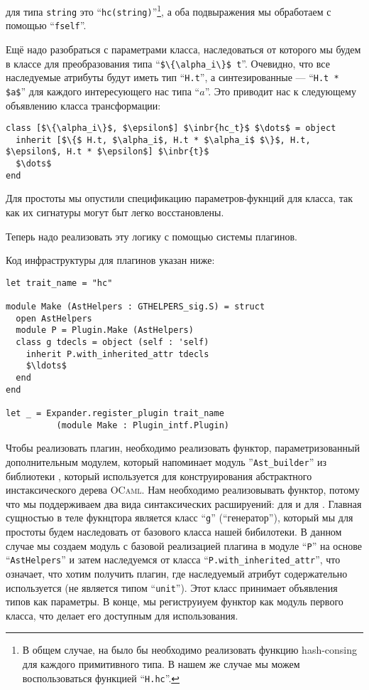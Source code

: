 для типа \lstinline{string} это ``\lstinline{hc(string)}''\footnote{В общем случае, на было бы необходимо реализовать функцию hash-consing для каждого примитивного типа. В нашем же случае мы можем воспользоваться функцией ``\lstinline{H.hc}''.}, а оба подвыражения мы обработаем с помощью ``\lstinline{fself}''.

Ещё надо разобраться с параметрами класса, наследоваться от которого мы будем в классе для преобразования типа ``\lstinline|$\{\alpha_i\}$ t|''. 
Очевидно, что все наследуемые атрибуты будут иметь тип  ``\lstinline{H.t}'', а синтезированные --- ``\lstinline{H.t * $a$}'' для каждого интересующего нас типа ``$a$''.
Это приводит нас к следующему объявлению класса трансформации:

\begin{lstlisting}
class [$\{\alpha_i\}$, $\epsilon$] $\inbr{hc_t}$ $\dots$ = object
  inherit [$\{$ H.t, $\alpha_i$, H.t * $\alpha_i$ $\}$, H.t, $\epsilon$, H.t * $\epsilon$] $\inbr{t}$
  $\dots$
end
\end{lstlisting}

Для простоты мы опустили спецификацию параметров-фукнций для класса, так как их сигнатуры могут быт легко восстановлены.

Теперь надо реализовать эту логику с помощью системы плагинов.

Код инфраструктуры для плагинов указан ниже:

\begin{lstlisting}
let trait_name = "hc"

module Make (AstHelpers : GTHELPERS_sig.S) = struct
  open AstHelpers
  module P = Plugin.Make (AstHelpers)
  class g tdecls = object (self : 'self)
    inherit P.with_inherited_attr tdecls 
    $\ldots$
  end
end

let _ = Expander.register_plugin trait_name 
          (module Make : Plugin_intf.Plugin)
\end{lstlisting}

Чтобы реализовать плагин, необходимо реализовать функтор, параметризованный дополнительным модулем, который напоминает модуль ''\texttt{Ast\_builder}'' из библиотеки 
, который используется для конструирования абстрактного инстаксического дерева  \textsc{OCaml}. Нам необходимо реализовывать функтор, потому что мы поддерживаем два вида синтаксических расшируений: для  и для . Главная сущностью в теле фукнцтора является класс ``\lstinline{g}'' (``генератор''), который мы для простоты будем наследовать от базового класса нашей бибилотеки.
В данном случае мы создаем модуль с базовой реализацией плагина в модуле 
``\lstinline{P}'' на основе ``\lstinline{AstHelpers}'' и затем наследуемся от класса 
``\lstinline{P.with_inherited_attr}'', что означает, что хотим получить плагин, где наследуемый атрибут содержательно используется (не является типом ``\lstinline|unit|'').
Этот класс принимает объявления типов как параметры.
В конце, мы региструиуем функтор как модуль первого класса, что делает его доступным для использования.

